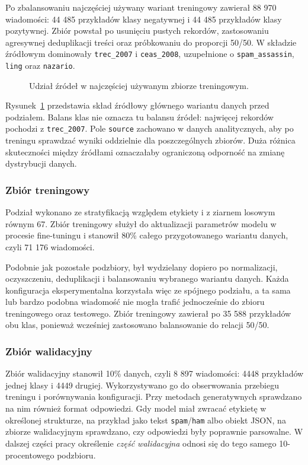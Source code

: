 Po zbalansowaniu najczęściej używany wariant treningowy zawierał 88 970
wiadomości: 44 485 przykładów klasy negatywnej i 44 485 przykładów klasy
pozytywnej. Zbiór powstał po usunięciu pustych rekordów, zastosowaniu
agresywnej deduplikacji treści oraz próbkowaniu do proporcji 50/50. W składzie
źródłowym dominowały \texttt{trec\_2007} i \texttt{ceas\_2008}, uzupełnione o
\texttt{spam\_assassin}, \texttt{ling} oraz \texttt{nazario}. 

\begin{figure}[htbp]
\centering

\caption{Udział źródeł w najczęściej używanym zbiorze treningowym.}
\label{fig:primary-source-composition}
\end{figure}

Rysunek~\ref{fig:primary-source-composition} przedstawia skład źródłowy
głównego wariantu danych przed podziałem. Balans klas nie oznacza tu balansu
źródeł: najwięcej rekordów pochodzi z \texttt{trec\_2007}. Pole
\texttt{source} zachowano w danych analitycznych, aby po treningu sprawdzać
wyniki oddzielnie dla poszczególnych zbiorów. Duża różnica skuteczności między
źródłami oznaczałaby ograniczoną odporność na zmianę dystrybucji danych.

\subsubsection{Zbiór treningowy}

Podział wykonano ze stratyfikacją względem etykiety i z ziarnem losowym równym
67. Zbiór treningowy służył do aktualizacji parametrów modelu w procesie
fine-tuningu i stanowił 80\% całego przygotowanego wariantu danych, czyli
71 176 wiadomości.

Podobnie jak pozostałe podzbiory, był wydzielany dopiero po normalizacji, oczyszczeniu, deduplikacji i
balansowaniu wybranego wariantu danych. Każda konfiguracja eksperymentalna
korzystała więc ze spójnego podziału, a ta sama lub bardzo podobna
wiadomość nie mogła trafić jednocześnie do zbioru treningowego oraz testowego.
Zbiór treningowy zawierał po 35 588 przykładów obu klas, ponieważ wcześniej
zastosowano balansowanie do relacji 50/50.

\subsubsection{Zbiór walidacyjny}

Zbiór walidacyjny stanowił 10\% danych, czyli 8 897 wiadomości: 4448 przykładów
jednej klasy i 4449 drugiej. Wykorzystywano go do obserwowania przebiegu
treningu i porównywania konfiguracji. Przy
metodach generatywnych sprawdzano na nim również format odpowiedzi. Gdy model
miał zwracać etykietę w określonej strukturze, na przykład jako tekst
\texttt{spam}/\texttt{ham} albo obiekt JSON, na zbiorze walidacyjnym sprawdzano,
czy odpowiedzi były poprawnie parsowalne. W dalszej części pracy określenie
\emph{część walidacyjna} odnosi się do tego samego 10-procentowego podzbioru.

